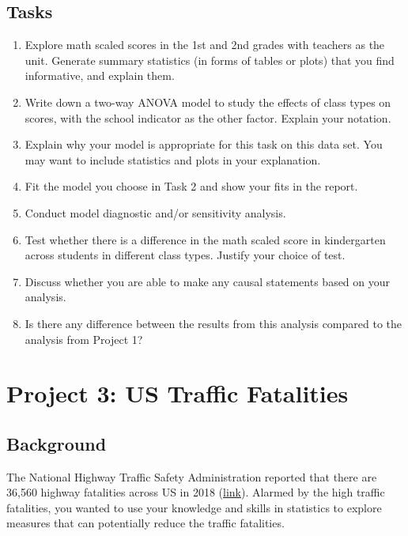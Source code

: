 \documentclass[12pt,]{book}
\providecommand{\tightlist}{%
  \setlength{\itemsep}{0pt}\setlength{\parskip}{0pt}}
\begin{document}
\subsection{Tasks}\label{tasks-1}

\begin{enumerate}
\def\labelenumi{\arabic{enumi}.}
\tightlist
\item
  Explore math scaled scores in the 1st and 2nd grades with teachers as
  the unit. Generate summary statistics (in forms of tables or plots)
  that you find informative, and explain them.
\item
  Write down a two-way ANOVA model to study the effects of class types
  on scores, with the school indicator as the other factor. Explain your
  notation.
\item
  Explain why your model is appropriate for this task on this data set.
  You may want to include statistics and plots in your explanation.
\item
  Fit the model you choose in Task 2 and show your fits in the report.
\item
  Conduct model diagnostic and/or sensitivity analysis.
\item
  Test whether there is a difference in the math scaled score in
  kindergarten across students in different class types. Justify your
  choice of test.
\item
  Discuss whether you are able to make any causal statements based on
  your analysis.
\item
  Is there any difference between the results from this analysis
  compared to the analysis from Project 1?
\end{enumerate}

\section{Project 3: US Traffic
Fatalities}\label{project-3-us-traffic-fatalities}

\subsection{Background}\label{background-2}

The National Highway Traffic Safety Administration reported that there
are 36,560 highway fatalities across US in 2018
(\href{nhtsa.gov/press-releases/roadway-fatalities-2018-fars}{link}).
Alarmed by the high traffic fatalities, you wanted to use your knowledge
and skills in statistics to explore measures that can potentially reduce
the traffic fatalities.
\end{document}
